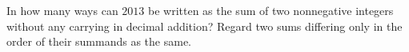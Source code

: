 In how many ways can $2013$ be written as the sum of two nonnegative integers without any carrying in decimal addition? Regard two sums differing only in the order of their summands as the same.

